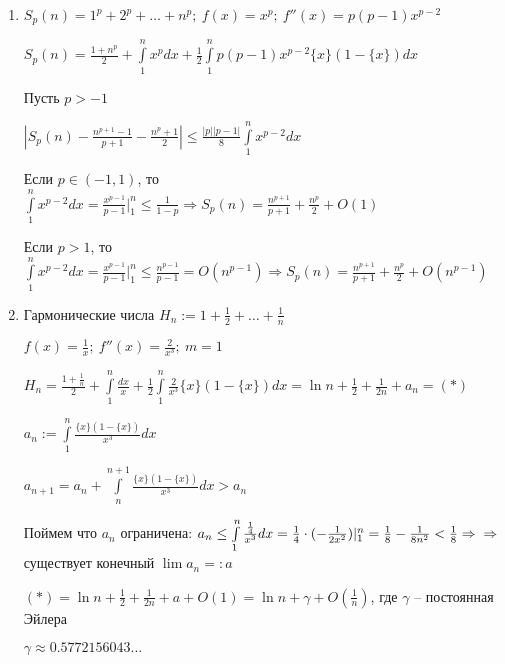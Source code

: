 \documentclass[12pt]{article}
\begin{document}
\begin{Example}{}
    \begin{enumerate}
        \item $S_p(n) = 1^p + 2^p + \ldots + n^p;\ f(x) = x^p;\ f''(x) = p(p - 1)x^{p - 2}$
        
        $S_p(n) = \frac{1 + n^p}{2} + \int\limits_1^n x^pdx + \frac{1}{2} \int\limits_1^n p(p - 1)x^{p - 2} \{x\}(1 - \{x\})dx$

        Пусть $p > -1$

        $|S_p(n) - \frac{n^{p + 1} - 1}{p + 1} - \frac{n^p + 1}{2}| \leq \frac{|p||p - 1|}{8} \int\limits_1^n x^{p - 2}dx$

        Если $p \in (-1, 1)$, то $\int\limits_1^n x^{p - 2}dx = \frac{x^{p - 1}}{p - 1}|_1^n \leq \frac{1}{1 - p} \Rightarrow S_p(n) = \frac{n^{p + 1}}{p + 1} + \frac{n^p}{2} + O(1)$

        Если $p > 1$, то $\int\limits_1^n x^{p - 2}dx = \frac{x^{p - 1}}{p - 1}|_1^n \leq \frac{n^{p - 1}}{p - 1} = O(n^{p - 1}) \Rightarrow S_p(n) = \frac{n^{p + 1}}{p + 1} + \frac{n^p}{2} + O(n^{p - 1})$

        \item Гармонические числа $H_n := 1 + \frac{1}{2} + \ldots + \frac{1}{n}$
        
        $f(x) = \frac{1}{x};\ f''(x) = \frac{2}{x^3};\ m = 1$

        $H_n = \frac{1 + \frac{1}{n}}{2} + \int\limits_1^n \frac{dx}{x} + \frac{1}{2}\int\limits_1^n \frac{2}{x^3}\{x\}(1 - \{x\})dx = \ln{n} + \frac{1}{2} + \frac{1}{2n} + a_n = (*)$

        $a_n := \int\limits_1^n  \frac{\{x\}(1 - \{x\})}{x^3}dx$

        $a_{n + 1} = a_n + \int\limits_n^{n + 1} \frac{\{x\}(1 - \{x\})}{x^3}dx > a_n$

        Поймем что $a_n$ ограничена: $a_n \leq \int\limits_1^n \frac{\frac{1}{4}}{x^3}dx = \frac{1}{4} \cdot (- \frac{1}{2x^2})|_1^n = \frac{1}{8} - \frac{1}{8n^2} < \frac{1}{8} \Rightarrow \\
        \Rightarrow$ существует конечный $\lim a_n =: a$

        $(*) = \ln{n} + \frac{1}{2} + \frac{1}{2n} + a + O(1) = \ln{n} + \gamma + O(\frac{1}{n})$, где $\gamma$ -- постоянная Эйлера

        \begin{nota}{}
            $\gamma \approx 0.5772156043\ldots$
        \end{nota}


\end{enumerate}
\end{Example}
\end{document}
